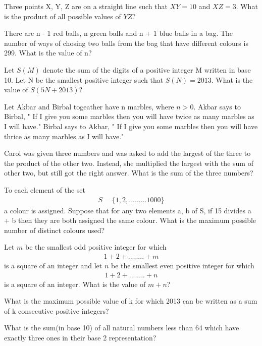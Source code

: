 \item Three points X, Y, Z are on a straight line such that $XY = 10$ and $XZ = 3$. What is the product of all possible values of $YZ$?

\item There are  n - 1 red balls, n green balls and n + 1 blue balls in a bag. The number of ways of chosing two balls from the bag that have different colours is 299. What is the value of n?

\item Let $S(M)$ denote the sum of the digits of a positive integer M written in base 10. Let N be the smallest positive integer such that $S(N) = 2013$. What is the value of $S(5N + 2013)$?

\item Let Akbar and Birbal togeather have n marbles, where $n > 0$. Akbar says to Birbal, " If I give you some marbles then you will have twice as many marbles as I will have." Birbal says to Akbar, " If I give you some marbles then you will have thrice as many marbles as I will have."

\item Carol was given three numbers and was asked to add the largest of the three to the product of the other two. Instead, she multiplied the largest with the sum of other two, but still got the right answer. What is the sum of the three numbers?

\item To each element of the set
\begin{align*}
S = \{1, 2,.........1000\}
\end{align*}
a colour is assigned. Suppose that for any two elements a, b of S, if 15 divides a + b then they are both assigned the same colour. What is the maximum possible number of distinct colours used?

\item Let $m$ be the smallest odd positive integer for which
\begin{align*}
1 + 2 +........+m
\end{align*}
is a square of an integer and let $n$ be the smallest even positive integer for which
\begin{align*}
1 + 2 +........+n 
\end{align*}
is a square of an integer. What is the value of $m + n$?

\item What is the maximum possible value of k for which 2013 can be written as a sum of k consecutive positive integers?

\item What is the sum(in base 10) of all natural numbers less than 64 which have exactly three ones in their base 2 representation?
